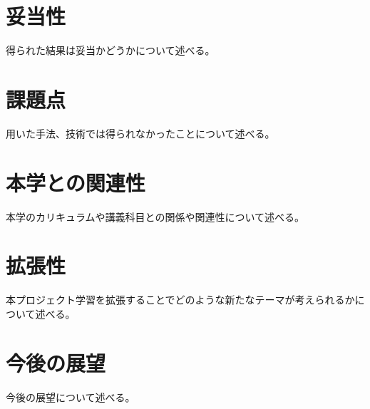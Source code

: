\section{妥当性}
得られた結果は妥当かどうかについて述べる。

\section{課題点}
用いた手法、技術では得られなかったことについて述べる。

\section{本学との関連性}
本学のカリキュラムや講義科目との関係や関連性について述べる。

\section{拡張性}
本プロジェクト学習を拡張することでどのような新たなテーマが考えられるかについて述べる。

\section{今後の展望}
今後の展望について述べる。

\newpage\clearpage
\vspace*{-20pt}
\printbibliography[segment=\therefsegment,heading=subbibliography]
